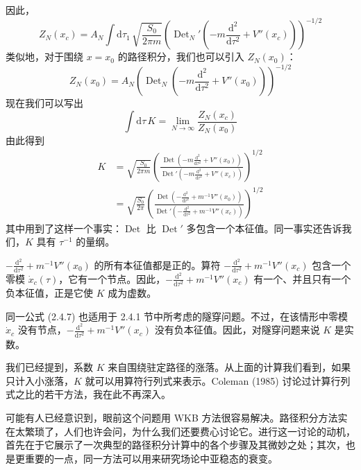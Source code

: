 因此，
\begin{equation*}
Z_N(x_c) = A_N \int \mathrm{d}\tau_1\, \sqrt{\frac{S_0}{2\pi m}} \left(\operatorname{Det}_N'\left(-m\frac{\mathrm{d}^2}{\mathrm{d}\tau^2} + V''(x_c)\right)\right)^{-1/2}\tag{2.4.5}
\end{equation*}
类似地，对于围绕 $x = x_0$ 的路径积分，我们也可以引入 $Z_N(x_0)$：
\begin{equation*}
Z_N(x_0) = A_N \left(\operatorname{Det}_N\left(-m\frac{\mathrm{d}^2}{\mathrm{d}\tau^2} + V''(x_0)\right)\right)^{-1/2}\tag{2.4.6}
\end{equation*}
现在我们可以写出
\begin{equation*}
\int \mathrm{d}\tau\, K = \lim_{N\to\infty} \frac{Z_N(x_c)}{Z_N(x_0)}
\end{equation*}
由此得到
\begin{align*}
K &= \sqrt{\frac{S_0}{2\pi m}} \left(\frac{\operatorname{Det}\left(-m\frac{\mathrm{d}^2}{\mathrm{d}\tau^2} + V''(x_0)\right)}{\operatorname{Det}'\left(-m\frac{\mathrm{d}^2}{\mathrm{d}\tau^2} + V''(x_c)\right)}\right)^{1/2} \\
&= \sqrt{\frac{S_0}{2\pi}} \left(\frac{\operatorname{Det}\left(-\frac{\mathrm{d}^2}{\mathrm{d}\tau^2} + m^{-1}V''(x_0)\right)}{\operatorname{Det}'\left(-\frac{\mathrm{d}^2}{\mathrm{d}\tau^2} + m^{-1}V''(x_c)\right)}\right)^{1/2}\tag{2.4.7}
\end{align*}
其中用到了这样一个事实：$\operatorname{Det}$ 比 $\operatorname{Det}'$ 多包含一个本征值。同一事实还告诉我们，$K$ 具有 $\tau^{-1}$ 的量纲。

$-\frac{\mathrm{d}^2}{\mathrm{d}\tau^2} + m^{-1}V''(x_0)$ 的所有本征值都是正的。算符 $-\frac{\mathrm{d}^2}{\mathrm{d}\tau^2} + m^{-1}V''(x_c)$ 包含一个零模 $\dot{x}_c(\tau)$，它有一个节点。因此，$-\frac{\mathrm{d}^2}{\mathrm{d}\tau^2} + m^{-1}V''(x_c)$ 有一个、并且只有一个负本征值，正是它使 $K$ 成为虚数。

同一公式 (2.4.7) 也适用于 2.4.1 节中所考虑的隧穿问题。不过，在该情形中零模 $\dot{x}_c$ 没有节点，$-\frac{\mathrm{d}^2}{\mathrm{d}\tau^2} + m^{-1}V''(x_c)$ 没有负本征值。因此，对隧穿问题来说 $K$ 是实数。

我们已经提到，系数 $K$ 来自围绕驻定路径的涨落。从上面的计算我们看到，如果只计入小涨落，$K$ 就可以用算符行列式来表示。Coleman (1985) 讨论过计算行列式之比的若干方法，我在此不再深入。

可能有人已经意识到，眼前这个问题用 WKB 方法很容易解决。路径积分方法实在太繁琐了，人们也许会问，为什么我们还要费心讨论它。进行这一讨论的动机，首先在于它展示了一次典型的路径积分计算中的各个步骤及其微妙之处；其次，也是更重要的一点，同一方法可以用来研究场论中亚稳态的衰变。

